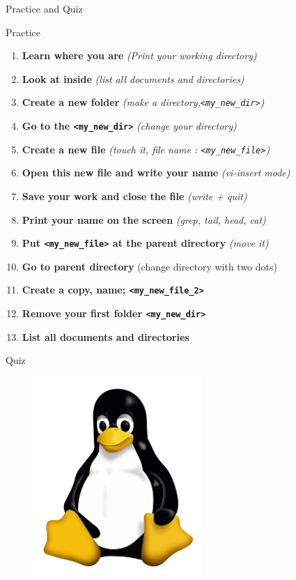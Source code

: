 \documentclass[ignorenonframetext,]{beamer}
\providecommand{\tightlist}{%
  \setlength{\itemsep}{0pt}\setlength{\parskip}{0pt}}
\begin{document}
\begin{frame}[fragile]{Practice and Quiz}

\begin{block}{Practice}

\begin{enumerate}
\def\labelenumi{\arabic{enumi}.}
\tightlist
\item
  \textbf{Learn where you are} \emph{(Print your working directory)}
\item
  \textbf{Look at inside} \emph{(list all documents and directories)}
\item
  \textbf{Create a new folder} \emph{(make a
  directory,\texttt{\textless{}my\_new\_dir\textgreater{}})}
\item
  \textbf{Go to the \texttt{\textless{}my\_new\_dir\textgreater{}}}
  \emph{(change your directory)}
\item
  \textbf{Create a new file} \emph{(touch it, file name :
  \texttt{\textless{}my\_new\_file\textgreater{}})}
\item
  \textbf{Open this new file and write your name} \emph{(vi-insert
  mode)}
\item
  \textbf{Save your work and close the file} \emph{(write + quit)}
\item
  \textbf{Print your name on the screen} \emph{(grep, tail, head, cat)}
\item
  \textbf{Put \texttt{\textless{}my\_new\_file\textgreater{}} at the
  parent directory} \emph{(move it)}
\item
  \textbf{Go to parent directory} (change directory with two dots)
\item
  \textbf{Create a copy, name;
  \texttt{\textless{}my\_new\_file\_2\textgreater{}}}
\item
  \textbf{Remove your first folder
  \texttt{\textless{}my\_new\_dir\textgreater{}}}
\item
  \textbf{List all documents and directories}
\end{enumerate}

\end{block}

\begin{block}{Quiz}

\begin{figure}
\centering
\includegraphics{linux_logo.png}
\caption{}
\end{figure}


\end{block}
\end{frame}
\end{document}
